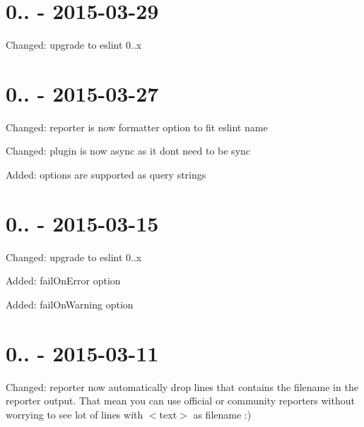 \section*{0.. -\/ 2015-\/03-\/29}


\begin{DoxyItemize}
\item Changed\+: upgrade to eslint 0..\+x
\end{DoxyItemize}

\section*{0.. -\/ 2015-\/03-\/27}


\begin{DoxyItemize}
\item Changed\+: {\ttfamily reporter} is now {\ttfamily formatter} option to fit eslint name
\item Changed\+: plugin is now async as it don\textquotesingle{}t need to be sync
\item Added\+: options are supported as query strings
\end{DoxyItemize}

\section*{0.. -\/ 2015-\/03-\/15}


\begin{DoxyItemize}
\item Changed\+: upgrade to eslint 0..\+x
\item Added\+: {\ttfamily fail\+On\+Error} option
\item Added\+: {\ttfamily fail\+On\+Warning} option
\end{DoxyItemize}

\section*{0.. -\/ 2015-\/03-\/11}


\begin{DoxyItemize}
\item Changed\+: {\ttfamily reporter} now automatically drop lines that contains the filename in the reporter output. That mean you can use official or community reporters without worrying to see lot of lines with {\ttfamily $<$text$>$} as filename \+:)
\end{DoxyItemize}

